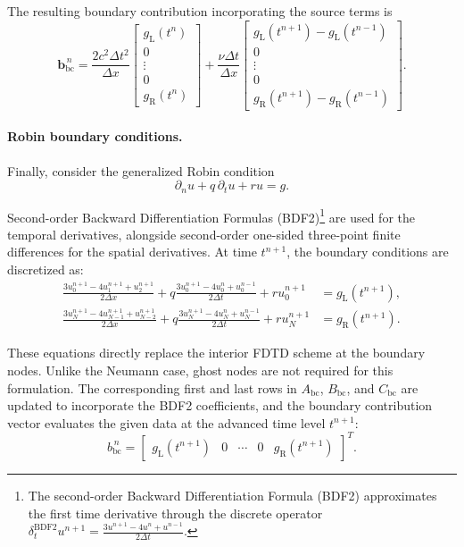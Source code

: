\documentclass{Configuration_Files/PoliMi3i_thesis}
\newif\ifshowthesischanges
\DeclareRobustCommand{\thesischange}[2]{%
    \ifshowthesischanges
        \textcolor{#1}{#2}%
    \else
        #2%
    \fi
}
\def\thesischange#1#2{#2}%
\begin{document}
The resulting boundary contribution incorporating the source terms is
\begin{equation*}
\mathbf{b}_{\mathrm{bc}}^{\,n}
=
\frac{2c^2\Delta t^2}{\Delta x}
\begin{bmatrix}
g_{\mathrm L}(t^n) \\
0 \\
\vdots \\
0 \\
g_{\mathrm R}(t^n)
\end{bmatrix}
+
\frac{\nu\Delta t}{\Delta x}
\begin{bmatrix}
g_{\mathrm L}(t^{n+1}) - g_{\mathrm L}(t^{n-1}) \\
0 \\
\vdots \\
0 \\
g_{\mathrm R}(t^{n+1}) - g_{\mathrm R}(t^{n-1})
\end{bmatrix}.
\end{equation*}

\paragraph{Robin boundary conditions.}

Finally, consider the generalized Robin condition
\begin{equation*}
\partial_nu
+
q\,\partial_tu
+
ru
=
g.
\end{equation*}

Second-order Backward Differentiation Formulas (BDF2)\footnote{\thesischange{red}{The second-order Backward Differentiation Formula (BDF2) approximates the first time derivative through the discrete operator $\delta_t^{\text{BDF2}} u^{n+1} = \frac{3u^{n+1}-4u^n+u^{n-1}}{2\Delta t}$.}} are used for the temporal derivatives, alongside second-order one-sided three-point finite differences for the spatial derivatives. At time $t^{n+1}$, the boundary conditions are discretized as:
\begin{align*}
\frac{3u_{0}^{n+1}-4u_{1}^{n+1}+u_{2}^{n+1}}{2\Delta x}
+
q\frac{3u_0^{n+1}-4u_0^{n}+u_0^{n-1}}{2\Delta t}
+
ru_0^{n+1}
&=
g_{\mathrm L}(t^{n+1}),
\\
\frac{3u_{N}^{n+1}-4u_{N-1}^{n+1}+u_{N-2}^{n+1}}{2\Delta x}
+
q\frac{3u_{N}^{n+1}-4u_{N}^{n}+u_{N}^{n-1}}{2\Delta t}
+
ru_{N}^{n+1}
&=
g_{\mathrm R}(t^{n+1}).
\end{align*}

These equations directly replace the interior FDTD scheme at the boundary nodes. Unlike the Neumann case, ghost nodes are not required for this formulation. The corresponding first and last rows in $A_{\mathrm{bc}}$, $B_{\mathrm{bc}}$, and $C_{\mathrm{bc}}$ are updated to incorporate the BDF2 coefficients, and the boundary contribution vector evaluates the given data at the advanced time level $t^{n+1}$:
\begin{equation*}
b_{\mathrm{bc}}^{\,n}
=
\begin{bmatrix}
g_{\mathrm L}(t^{n+1})
&
0
&
\cdots
&
0
&
g_{\mathrm R}(t^{n+1})
\end{bmatrix}^{T}.
\end{equation*}
\end{document}
